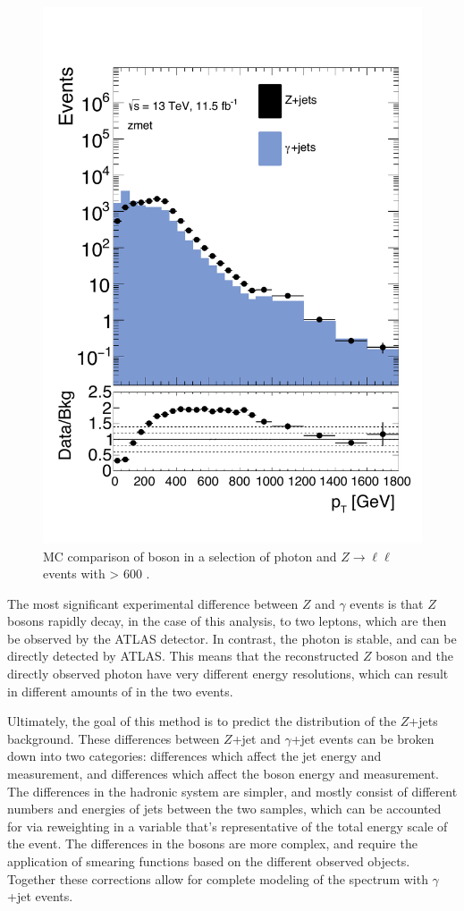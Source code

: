 \begin{centering}
\begin{figure}[!hbt]
\myfloatalign
\includegraphics[width=.85\linewidth]{figures/photons/MC_hist_pt_0_SF_2j_2016_mcmetl___zmet_.pdf}
\caption{\ac{MC} comparison of boson \pt in a selection of photon and $Z\rightarrow\ell\ell$ events with \HT > 600 \gev. }
\label{fig:photon_ptdist}
\end{figure}
\end{centering}

The most significant experimental difference between $Z$ and $\gamma$ events is that $Z$ bosons rapidly decay, in the case of this analysis, to two leptons, which are then be observed by the ATLAS detector. In contrast, the photon is stable, and can be directly detected by ATLAS. This means that the reconstructed $Z$ boson and the directly observed photon have very different energy resolutions, which can result in different amounts of \met in the two events.

Ultimately, the goal of this method is to predict the \met distribution of the $Z$+jets background. These differences between $Z$+jet and $\gamma$+jet events can be broken down into two categories: differences which affect the jet energy and measurement, and differences which affect the boson energy and measurement. The differences in the hadronic system are simpler, and mostly consist of different numbers and energies of jets between the two samples, which can be accounted for via reweighting in a variable that's representative of the total energy scale of the event. The differences in the bosons are more complex, and require the application of smearing functions based on the different observed objects. Together these corrections allow for complete modeling of the \dyjets \met spectrum with $\gamma$+jet events.

